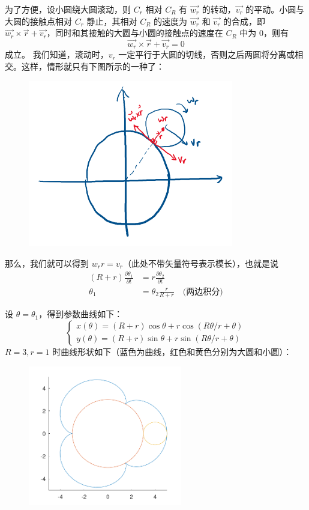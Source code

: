 ﻿\documentclass{article}
\begin{document}
为了方便，设小圆绕大圆滚动，则 $ C_r $ 相对 $ C_R $ 有 $ \vec{w_r} $ 的转动，$ \vec{v_r} $ 的平动。小圆与大圆的接触点相对 $ C_r $ 静止，其相对 $ C_R $ 的速度为 $ \vec{w_r} $ 和 $ \vec{v_r} $ 的合成，即 $ \vec{w_r} \times \vec{r} + \vec{v_r} $，同时和其接触的大圆与小圆的接触点的速度在 $ C_R $ 中为 0，则有
$$
\vec{w_r} \times \vec{r} + \vec{v_r} = 0
$$
成立。
我们知道，滚动时，$ v_r $ 一定平行于大圆的切线，否则之后两圆将分离或相交。这样，情形就只有下图所示的一种了：
\begin{figure}[H]
	\centering
	\includegraphics[width=0.8\textwidth]{fig-2}\\
	\label{fig:fig-2}
\end{figure}

那么，我们就可以得到 $ w_r r = v_r $（此处不带矢量符号表示模长），也就是说
\begin{align*}
	(R+r)\frac{\partial \theta_1}{\partial t} &= r \frac{\partial \theta_2}{\partial t}\\
	\theta_1 &= \theta_2 \frac{r}{R+r} \quad \text{(两边积分)}
\end{align*}

设 $ \theta = \theta_1 $，得到参数曲线如下：
\[
\begin{cases}
	x(\theta) = (R+r) \cos \theta + r \cos (R \theta / r + \theta) \\
	y(\theta) = (R+r) \sin \theta + r \sin (R \theta / r + \theta)
\end{cases}
\]
$ R = 3, r = 1 $ 时曲线形状如下（蓝色为曲线，红色和黄色分别为大圆和小圆）：
\begin{figure}[H]
	\centering
	\includegraphics[width=0.6\textwidth]{fig-3}\\
	\label{fig:fig-3}
\end{figure}
\end{document}
